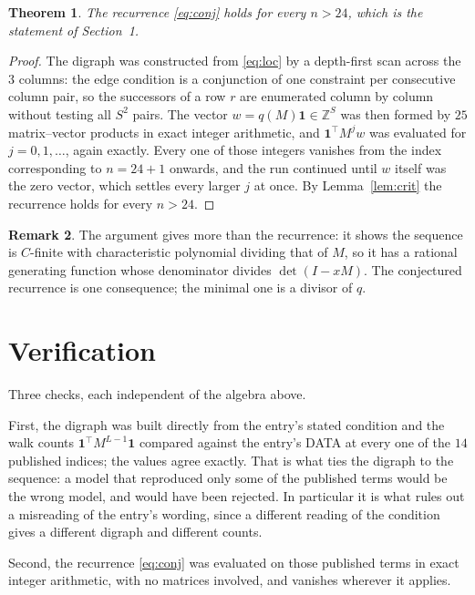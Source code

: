 \documentclass[11pt,a4paper]{article}
\theoremstyle{plain}
\newtheorem{theorem}{Theorem}
\theoremstyle{definition}
\newtheorem{remark}[theorem]{Remark}
\begin{document}
\begin{theorem}
The recurrence \eqref{eq:conj} holds for every $n>24$, which is the statement of
Section~1.
\end{theorem}

\begin{proof}
The digraph was constructed from \eqref{eq:loc} by a depth-first scan across the $3$
columns: the edge condition is a conjunction of one constraint per consecutive column
pair, so the successors of a row $r$ are enumerated column by column without testing all
$S^2$ pairs. The vector $w=q(M)\mathbf{1}\in\mathbb{Z}^{S}$ was then formed by $25$
matrix--vector products in exact integer arithmetic, and $\mathbf{1}^{\!\top}M^{j}w$ was
evaluated for $j=0,1,\dots$, again exactly. Every one of those integers vanishes from the
index corresponding to $n=24+1$ onwards, and the run continued until $w$ itself was the
zero vector, which settles every larger $j$ at once. By Lemma~\ref{lem:crit} the recurrence
holds for every $n>24$.
\end{proof}

\begin{remark}
The argument gives more than the recurrence: it shows the sequence is $C$-finite with
characteristic polynomial dividing that of $M$, so it has a rational generating function
whose denominator divides $\det(I-xM)$. The conjectured recurrence is one consequence; the
minimal one is a divisor of $q$.
\end{remark}

\section{Verification}

Three checks, each independent of the algebra above.

First, the digraph was built directly from the entry's stated condition and the walk counts
$\mathbf{1}^{\!\top}M^{L-1}\mathbf{1}$ compared against the entry's DATA at
every one of the $14$ published indices; the values agree exactly. That is what ties
the digraph to the sequence: a model that reproduced only some of the published terms would
be the wrong model, and would have been rejected. In particular it is what rules out a
misreading of the entry's wording, since a different reading of the condition gives a
different digraph and different counts.

Second, the recurrence \eqref{eq:conj} was evaluated on those published terms in exact
integer arithmetic, with no matrices involved, and vanishes wherever it applies.
\end{document}
